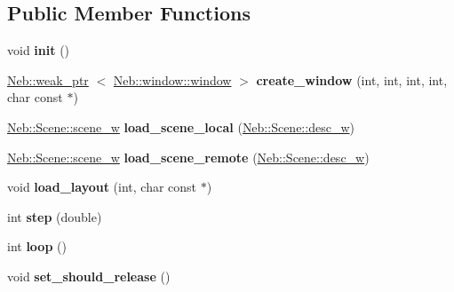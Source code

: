 \subsection*{\-Public \-Member \-Functions}
\begin{DoxyCompactItemize}
\item 
\hypertarget{classNeb_1_1app_a32164de189f14d814cfaca3e898b3a7f}{void {\bfseries init} ()}\label{classNeb_1_1app_a32164de189f14d814cfaca3e898b3a7f}

\item 
\hypertarget{classNeb_1_1app_a102dfddbecdd44cb9d310a8941a707ef}{\hyperlink{classNeb_1_1weak__ptr}{\-Neb\-::weak\-\_\-ptr}\*
$<$ \hyperlink{classNeb_1_1window_1_1window}{\-Neb\-::window\-::window} $>$ {\bfseries create\-\_\-window} (int, int, int, int, char const $\ast$)}\label{classNeb_1_1app_a102dfddbecdd44cb9d310a8941a707ef}

\item 
\hypertarget{classNeb_1_1app_a099e5961b00946a31c2b6d4da029f352}{\hyperlink{classNeb_1_1weak__ptr}{\-Neb\-::\-Scene\-::scene\-\_\-w} {\bfseries load\-\_\-scene\-\_\-local} (\hyperlink{classNeb_1_1weak__ptr}{\-Neb\-::\-Scene\-::desc\-\_\-w})}\label{classNeb_1_1app_a099e5961b00946a31c2b6d4da029f352}

\item 
\hypertarget{classNeb_1_1app_a535605a9b6365aca41ca5655ae73a61c}{\hyperlink{classNeb_1_1weak__ptr}{\-Neb\-::\-Scene\-::scene\-\_\-w} {\bfseries load\-\_\-scene\-\_\-remote} (\hyperlink{classNeb_1_1weak__ptr}{\-Neb\-::\-Scene\-::desc\-\_\-w})}\label{classNeb_1_1app_a535605a9b6365aca41ca5655ae73a61c}

\item 
\hypertarget{classNeb_1_1app_ad0e771e82f86ee786e1b342c18975fd2}{void {\bfseries load\-\_\-layout} (int, char const $\ast$)}\label{classNeb_1_1app_ad0e771e82f86ee786e1b342c18975fd2}

\item 
\hypertarget{classNeb_1_1app_ae364bf8705edcd0b65375d6831df326f}{int {\bfseries step} (double)}\label{classNeb_1_1app_ae364bf8705edcd0b65375d6831df326f}

\item 
\hypertarget{classNeb_1_1app_a3d1e3aa10f78a8e737352a90c1ff2004}{int {\bfseries loop} ()}\label{classNeb_1_1app_a3d1e3aa10f78a8e737352a90c1ff2004}

\item 
\hypertarget{classNeb_1_1app_a585d3455638323086057befeb4e91a1b}{void {\bfseries set\-\_\-should\-\_\-release} ()}\label{classNeb_1_1app_a585d3455638323086057befeb4e91a1b}


\end{DoxyCompactItemize}
